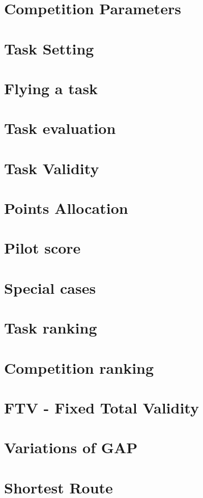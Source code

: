 \documentclass{article}
\begin{document}
\newpage
\section{Competition Parameters}


\newpage
\section{Task Setting}


\newpage
\section{Flying a task}


\newpage
\section{Task evaluation}


\newpage
\section{Task Validity}


\newpage
\section{Points Allocation}


\newpage
\section{Pilot score}


\newpage
\section{Special cases}


\newpage
\section{Task ranking}


\newpage
\section{Competition ranking}


\newpage
\section{FTV - Fixed Total Validity}


\newpage
\appendix
\appendixpage
\addappheadtotoc

\section{Variations of GAP}


\section{Shortest Route}

\end{document}
